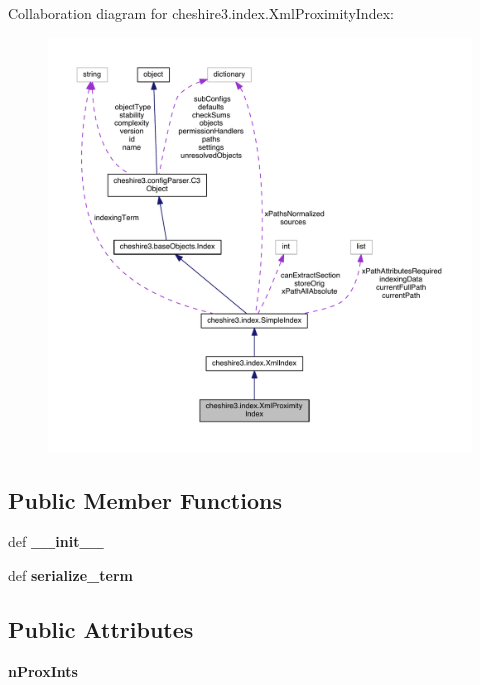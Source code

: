 Collaboration diagram for cheshire3.\-index.\-Xml\-Proximity\-Index\-:
\nopagebreak
\begin{figure}[H]
\begin{center}
\leavevmode
\includegraphics[width=350pt]{classcheshire3_1_1index_1_1_xml_proximity_index__coll__graph}
\end{center}
\end{figure}
\subsection*{Public Member Functions}
\begin{DoxyCompactItemize}
\item 
\hypertarget{classcheshire3_1_1index_1_1_xml_proximity_index_ac9b49bfb487ef0e5e869fdb05f08f469}{def {\bfseries \-\_\-\-\_\-init\-\_\-\-\_\-}}\label{classcheshire3_1_1index_1_1_xml_proximity_index_ac9b49bfb487ef0e5e869fdb05f08f469}

\item 
\hypertarget{classcheshire3_1_1index_1_1_xml_proximity_index_ac480879be114fccfbcaeb8c97e7c07e8}{def {\bfseries serialize\-\_\-term}}\label{classcheshire3_1_1index_1_1_xml_proximity_index_ac480879be114fccfbcaeb8c97e7c07e8}

\end{DoxyCompactItemize}
\subsection*{Public Attributes}
\begin{DoxyCompactItemize}
\item 
\hypertarget{classcheshire3_1_1index_1_1_xml_proximity_index_a059a2015f6f04ea2f6849cbb886287f2}{{\bfseries n\-Prox\-Ints}}\label{classcheshire3_1_1index_1_1_xml_proximity_index_a059a2015f6f04ea2f6849cbb886287f2}

\end{DoxyCompactItemize}
